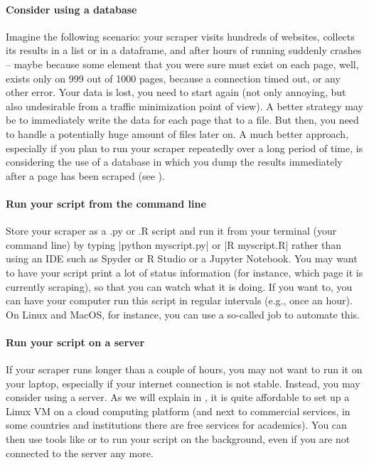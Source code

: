 \paragraph{Consider using a database} Imagine the following scenario: your scraper visits hundreds of websites, collects its results in a list or in a dataframe, and after hours of running suddenly crashes -- maybe because some element that you were sure must exist on each page, well, exists only on 999 out of 1000 pages, because a connection timed out, or any other error. Your data is lost, you need to start again (not only annoying, but also undesirable from a traffic minimization point of view). A better strategy may be to immediately write the data for each page that to a file. But then, you need to handle a potentially huge amount of files later on. A much better approach, especially if you plan to run your scraper repeatedly over a long period of time, is considering the use of a database in which you dump the results immediately after a page has been scraped (see ).

\paragraph{Run your script from the command line} Store your scraper as a .py or .R script and run it from your terminal (your command line) by typing |python myscript.py| or |R myscript.R| rather than using an IDE such as Spyder or R Studio or a Jupyter Notebook. You may want to have your script print a lot of status information (for instance, which page it is currently scraping), so that you can watch what it is doing. If you want to, you can have your computer run this script in regular intervals (e.g., once an hour). On Linux and MacOS, for instance, you can use a so-called  job to automate this.

\paragraph{Run your script on a server} If your scraper runs longer than a couple of hours, you may not want to run it on your laptop, especially if your internet connection is not stable. Instead, you may consider using a server. As we will explain in , it is quite affordable to set up a Linux VM on a cloud computing platform (and next to commercial services, in some countries and institutions there are free services for academics). You can then use tools like  or  to run your script on the background, even if you are not connected to the server any more.
